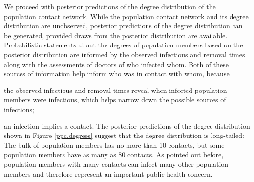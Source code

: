 We proceed with posterior predictions of the degree distribution of the population contact network.
While the population contact network and its degree distribution are unobserved,
posterior predictions of the degree distribution can be generated,
provided draws from the posterior distribution are available.
Probabilistic statements about the degrees of population members based on the posterior distribution are informed by the observed infectious and removal times along with the assessments of doctors of who infected whom.
Both of these sources of information help inform who was in contact with whom,
because
\bi
\item the observed infectious and removal times reveal when infected population members were infectious,
which helps narrow down the possible sources of infections;
\item an infection implies a contact.
\ei
The posterior predictions of the degree distribution shown in Figure \ref{ppc.degrees} suggest that the degree distribution is long-tailed:
The bulk of population members has no more than 10 contacts,
but some population members have as many as 80 contacts.
As pointed out before,
population members with many contacts can infect many other population members and therefore represent an important public health concern.
